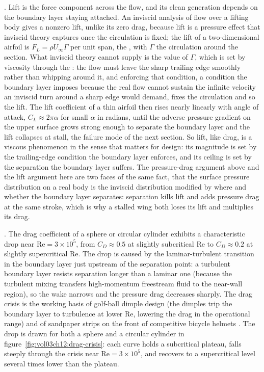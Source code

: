 . Lift is the force component
across the flow, and its clean generation depends on the boundary layer
staying attached. An inviscid analysis of flow over a lifting body gives
a nonzero lift, unlike its zero drag, because lift is a pressure effect
that inviscid theory captures once the circulation is fixed; the lift of
a two-dimensional airfoil is $F_L = \rho U_\infty\Gamma$ per unit span,
the , with $\Gamma$ the circulation
around the section. What inviscid theory cannot supply is the value of
$\Gamma$, which is set by viscosity through the : the flow must leave the sharp trailing edge smoothly rather
than whipping around it, and enforcing that condition, a condition the
boundary layer imposes because the real flow cannot sustain the infinite
velocity an inviscid turn around a sharp edge would demand, fixes the
circulation and so the lift. The lift coefficient of a thin airfoil then
rises nearly linearly with angle of attack, $C_L\approx2\pi\alpha$ for
small $\alpha$ in radians, until the adverse pressure gradient on the
upper surface grows strong enough to separate the boundary layer and the
lift collapses at stall, the failure mode of the next section. So lift,
like drag, is a viscous phenomenon in the sense that matters for design:
its magnitude is set by the trailing-edge condition the boundary layer
enforces, and its ceiling is set by the separation the boundary layer
suffers. The pressure-drag argument above and the lift argument here are
two faces of the same fact, that the surface pressure distribution on a
real body is the inviscid distribution modified by where and whether the
boundary layer separates: separation kills lift and adds pressure drag at
the same stroke, which is why a stalled wing both loses its lift and
multiplies its drag.

. The drag coefficient of a sphere or
circular cylinder exhibits a characteristic drop near $\text{Re} =
3\times 10^5$, from $C_D \approx 0.5$ at slightly subcritical Re to
$C_D \approx 0.2$ at slightly supercritical Re. The drop is caused
by the laminar-turbulent transition in the boundary layer just
upstream of the separation point: a turbulent boundary layer
resists separation longer than a laminar one (because the turbulent
mixing transfers high-momentum freestream fluid to the near-wall
region), so the wake narrows and the pressure drag decreases
sharply. The drag crisis is the working basis of golf-ball dimple
design (the dimples trip the boundary layer to turbulence at lower
$\text{Re}$, lowering the drag in the operational range) and of
sandpaper strips on the front of competitive bicycle helmets
\cite{text:anderson-aerodynamics}. The drop is drawn for both a
sphere and a circular cylinder in
figure~\ref{fig:vol03ch12:drag-crisis}: each curve holds a
subcritical plateau, falls steeply through the crisis near
$\text{Re}=3\times10^5$, and recovers to a supercritical level
several times lower than the plateau.

